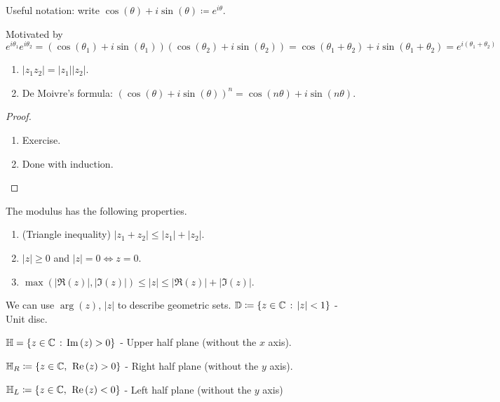 \documentclass[10pt, a4paper]{article}
\begin{document}
Useful notation:
write $\cos(\theta) + i\sin(\theta) \coloneqq e ^ {i\theta}$.

Motivated by
\[
e ^ {i\theta_1}e ^ {i\theta_2} = (\cos(\theta_1) + i\sin(\theta_1))(\cos(\theta_2) + i\sin(\theta_2)) = \cos(\theta_1 + \theta_2) + i\sin(\theta_1 + \theta_2) = e ^ {i(\theta_1 + \theta_2)}
\]

\begin{corollary}\phantom{}
    \begin{enumerate}[label = (\roman*)]
        \item $|z_1z_2| = |z_1||z_2|$.
        
        \item De Moivre's formula:
        $(\cos(\theta) + i\sin(\theta)) ^ n = \cos(n\theta) + i\sin(n\theta)$.
    \end{enumerate}

    \begin{proof}
        \begin{enumerate}[label = (\roman*)]
            \item Exercise.

            \item Done with induction.
        \end{enumerate}
    \end{proof}
\end{corollary}

The modulus has the following properties.
\begin{enumerate}[label = (\roman*)]
    \item
    (Triangle inequality)
    $|z_1 + z_2| \leq |z_1| + |z_2|$.

    \item $|z| \geq 0$ and $|z| = 0 \iff z = 0$.

    \item $\max(|\Re(z)|, |\Im(z)|) \leq |z| \leq |\Re(z)| + |\Im(z)|$.
\end{enumerate}

We can use $\arg(z)$,
$|z|$ to describe geometric sets.
$\mathbb{D} \coloneqq \{z \in \mathbb{C}\,:\, |z| < 1\}$ -
Unit disc.

$\mathbb{H} = \{z \in \mathbb{C}\,:\, \mathrm{Im}\,(z) > 0\}$ -
Upper half plane
(without the $x$ axis).

$\mathbb{H}_{R} \coloneqq \{z \in \mathbb{C},\:\, \mathrm{Re}\,(z) > 0\}$ -
Right half plane
(without the $y$ axis).

$\mathbb{H}_{L} \coloneqq \{z \in \mathbb{C},\:\, \mathrm{Re}\,(z) < 0\}$ -
Left half plane
(without the $y$ axis)
\end{document}
